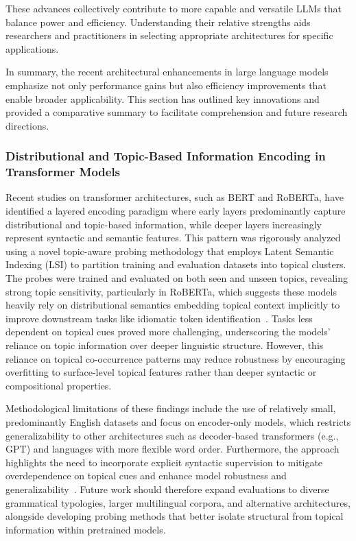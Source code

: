 \documentclass[sigconf]{acmart}
\begin{document}
These advances collectively contribute to more capable and versatile LLMs that balance power and efficiency. Understanding their relative strengths aids researchers and practitioners in selecting appropriate architectures for specific applications.

In summary, the recent architectural enhancements in large language models emphasize not only performance gains but also efficiency improvements that enable broader applicability. This section has outlined key innovations and provided a comparative summary to facilitate comprehension and future research directions.

\subsubsection{Distributional and Topic-Based Information Encoding in Transformer Models}

Recent studies on transformer architectures, such as BERT and RoBERTa, have identified a layered encoding paradigm where early layers predominantly capture distributional and topic-based information, while deeper layers increasingly represent syntactic and semantic features. This pattern was rigorously analyzed using a novel topic-aware probing methodology that employs Latent Semantic Indexing (LSI) to partition training and evaluation datasets into topical clusters. The probes were trained and evaluated on both seen and unseen topics, revealing strong topic sensitivity, particularly in RoBERTa, which suggests these models heavily rely on distributional semantics embedding topical context implicitly to improve downstream tasks like idiomatic token identification~\cite{ref44}. Tasks less dependent on topical cues proved more challenging, underscoring the models’ reliance on topic information over deeper linguistic structure. However, this reliance on topical co-occurrence patterns may reduce robustness by encouraging overfitting to surface-level topical features rather than deeper syntactic or compositional properties.

Methodological limitations of these findings include the use of relatively small, predominantly English datasets and focus on encoder-only models, which restricts generalizability to other architectures such as decoder-based transformers (e.g., GPT) and languages with more flexible word order. Furthermore, the approach highlights the need to incorporate explicit syntactic supervision to mitigate overdependence on topical cues and enhance model robustness and generalizability~\cite{ref44}. Future work should therefore expand evaluations to diverse grammatical typologies, larger multilingual corpora, and alternative architectures, alongside developing probing methods that better isolate structural from topical information within pretrained models.
\end{document}
